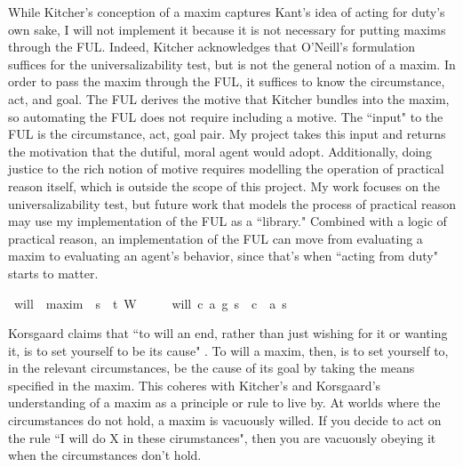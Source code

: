 \begin{isabellebody}
\begin{isamarkuptext}
While Kitcher's conception of a maxim captures Kant's idea of acting for duty's own sake, I will not implement it 
because it is not necessary for putting maxims through the FUL. Indeed, Kitcher acknowledges that 
O'Neill's formulation suffices for the universalizability test, but is not the general notion of a maxim.
In order to pass the maxim through the FUL, it suffices to know the circumstance, act, and goal. The FUL
derives the motive that Kitcher bundles into the maxim, so automating the FUL does not require 
including a motive. The ``input" to the FUL is the circumstance, act, goal pair. My project takes 
this input and returns the motivation that the dutiful, moral agent would adopt. Additionally, doing
justice to the rich notion of motive requires modelling the operation of practical reason itself, 
which is outside the scope of this project. My work focuses on the universalizability test, but future work that 
models the process of practical reason may use my implementation of the FUL as a ``library." Combined 
with a logic of practical reason, an implementation of the FUL can move from evaluating a maxim to 
evaluating an agent's behavior, since that's when ``acting from duty" starts to matter.%
\end{isamarkuptext}\isamarkuptrue%
\isamarkupfalse%
\ will\ {\isacharcolon}{\isacharcolon}\ {\isachardoublequoteopen}maxim\ {\isasymRightarrow}\ s{\isasymRightarrow}\ \ t{\isachardoublequoteclose}\ {\isacharparenleft}{\isachardoublequoteopen}W\ {\isacharunderscore}\ {\isacharunderscore}{\isachardoublequoteclose}{\isacharparenright}\isanewline
\ \ \ {\isachardoublequoteopen}will\ {\isacharparenleft}c{\isacharcomma}\ a{\isacharcomma}\ g{\isacharparenright}\ s\ {\isacharequal}\ {\isacharparenleft}c\ \isactrlbold {\isasymrightarrow}\ {\isacharparenleft}a\ s{\isacharparenright}{\isacharparenright}{\isachardoublequoteclose}%
\begin{isamarkuptext}%
Korsgaard claims that ``to will an end, rather than just
wishing for it or wanting it, is to set yourself to be its cause" \cite{sources}. To will a maxim, then, 
is to set yourself to, in the relevant circumstances, be the cause of its goal by taking the means 
specified in the maxim. This coheres with 
Kitcher's and Korsgaard's understanding of a maxim as a principle or rule to live by. At worlds 
where the circumstances do not hold, a maxim is vacuously willed. If you decide to act on the rule ``I will 
do X in these cirumstances", then you are vacuously obeying it when the circumstances don't hold.  


\end{isamarkuptext}
\end{isabellebody}
